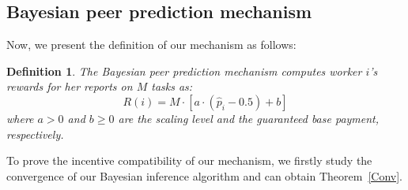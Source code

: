 \documentclass{article}
\newtheorem{definition}{Definition}
\begin{document}
\subsection{Bayesian peer prediction mechanism}
Now, we present the definition of our mechanism as follows:
\begin{definition}
The Bayesian peer prediction mechanism computes worker $i$'s rewards for her reports on $M$ tasks as:
\begin{equation}
R(i)=M\cdot \left[a\cdot (\hat{p}_i-0.5) +b\right]
\end{equation}
where $a>0$ and $b\geq 0$ are the scaling level and the guaranteed base payment, respectively.
\end{definition}
\noindent To prove the incentive compatibility of our mechanism, we firstly study the convergence of our Bayesian inference algorithm and can obtain Theorem~\ref{Conv}.
\end{document}
